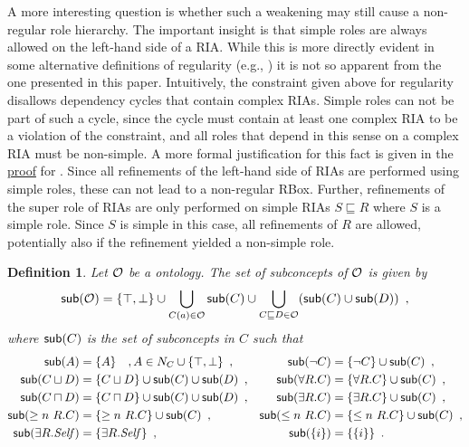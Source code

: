 \documentclass[
]{ceurart}
\newtheorem{definition}{Definition}
\begin{document}
A more interesting question is whether such a weakening may still cause a non-regular role hierarchy. The important insight is that simple roles are always allowed on the left-hand side of a RIA. While this is more directly evident in some alternative definitions of regularity (e.g., \cite{rudolph2011foundations}) it is not so apparent from the one presented in this paper. Intuitively, the constraint given above for regularity disallows dependency cycles that contain complex RIAs. Simple roles can not be part of such a cycle, since the cycle must contain at least one complex RIA to be a violation of the constraint, and all roles that depend in this sense on a complex RIA must be non-simple. A more formal justification for this fact is given in the \hyperref[proof:regularity]{proof} for .
Since all refinements of the left-hand side of RIAs are performed using simple roles, these can not lead to a non-regular RBox. Further, refinements of the super role of RIAs are only performed on simple RIAs $S \sqsubseteq R$ where $S$ is a simple role. Since $S$ is simple in this case, all refinements of $R$ are allowed, potentially also if the refinement yielded a non-simple role.

\begin{definition}
  Let $\mathcal{O}$ be a \SROIQ ontology. The set of \emph{subconcepts} of $\mathcal{O}$ is given by 
  \begin{align*}
    \mathop{\mathsf{sub}}(\mathcal{O}) = \{\top, \bot\} \cup \bigcup_{C(a) \in \mathcal{O}} \mathop{\mathsf{sub}}(C) \cup \bigcup_{C \sqsubseteq D \in \mathcal{O}} ( \mathop{\mathsf{sub}}(C) \cup \mathop{\mathsf{sub}}(D) ) \enspace,
  \end{align*}
  where $\mathop{\mathsf{sub}}(C)$ is the set of \emph{subconcepts} in $C$ such that
  \begin{align*}
    \mathop{\mathsf{sub}}(A) &= \{ A \} \quad , A \in N_C \cup \{ \top, \bot \} \enspace, &
    \mathop{\mathsf{sub}}(\lnot C) &= \{ \lnot C \} \cup \mathop{\mathsf{sub}}(C) \enspace, \\
    \mathop{\mathsf{sub}}(C \sqcup D) &= \{ C \sqcup D \} \cup \mathop{\mathsf{sub}}(C) \cup \mathop{\mathsf{sub}}(D) \enspace, &
    \mathop{\mathsf{sub}}(\forall R.C) &= \{ \forall R.C \} \cup \mathop{\mathsf{sub}}(C) \enspace, \\
    \mathop{\mathsf{sub}}(C \sqcap D) &= \{ C \sqcap D \} \cup \mathop{\mathsf{sub}}(C) \cup \mathop{\mathsf{sub}}(D) \enspace, &
    \mathop{\mathsf{sub}}(\exists R.C) &= \{ \exists R.C \} \cup \mathop{\mathsf{sub}}(C) \enspace, \\
    \mathop{\mathsf{sub}}(\geq n~R.C) &= \{ \geq n~R.C \} \cup \mathop{\mathsf{sub}}(C) \enspace, &
    \mathop{\mathsf{sub}}(\leq n~R.C) &= \{ \leq n~R.C \} \cup \mathop{\mathsf{sub}}(C) \enspace, \\
    \mathop{\mathsf{sub}}(\exists R.\mathit{Self}) &= \{ \exists R.\mathit{Self} \} \enspace, &
    \mathop{\mathsf{sub}}(\{i\}) &= \{ \{i\} \} \enspace.
  \end{align*}
\end{definition}
\end{document}
